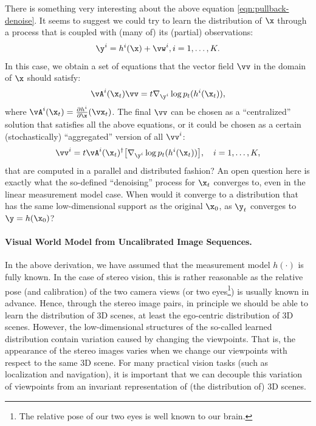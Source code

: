 \documentclass[../../book-main.tex]{subfiles}
\begin{document}
\begin{remark}
    {There is something very interesting about the above equation
        \eqref{eqn:pullback-denoise}. It seems to suggest we could
        try to learn the distribution of $\x$ through a process that
        is coupled with (many of) its (partial) observations:
        \begin{equation}
            \y^i = h^i(\x) +\vw^i, i =1, \ldots, K.
        \end{equation} In this case, we obtain a set of equations
        that the vector field $\vv$ in the domain of $\x$ should satisfy:
        \begin{equation}
            \vA^i(\x_t) \vv = t \nabla_{\y^i} \log p_t(h^i(\x_t)),
            \label{eqn:federated-pushforward}
        \end{equation}
        where $\vA^i(\x_t) = \frac{\partial h^i}{\partial
        \x}(\vx_t)$. The final $\vv$ can be chosen as a
        ``centralized'' solution that satisfies all the above
        equations, or it could be chosen as a certain
        (stochastically) ``aggregated'' version of all $\vv^i$:
        \begin{equation}
            \vv^i = t\vA^i(\x_t)^\dagger \big[\nabla_{\y^i} \log
            p_t(h^i(\x_t))\big], \quad i = 1, \ldots, K,
        \end{equation}
        that are computed in a parallel and distributed fashion? An open
        question here is exactly what the so-defined ``denoising''
        process for $\x_t$ converges to, even in the linear measurement
        model case. When would it converge to a distribution that has the
        same low-dimensional support as the original $\x_0$, as $\y_t$
    converges to $\y = h(\x_0)$? }
\end{remark}

\paragraph{Visual World Model from Uncalibrated Image Sequences.}

In the above derivation, we have assumed that the measurement model
$h(\cdot)$ is fully known. In the case of stereo vision, this is
rather reasonable as the relative pose (and calibration) of the two
camera views (or two eyes\footnote{The relative pose of our two eyes
is well known to our brain.}) is usually known in advance. Hence,
through the stereo image pairs, in principle we should be able to
learn the distribution of 3D scenes, at least the ego-centric
distribution of 3D scenes. However, the low-dimensional structures of
the so-called learned distribution contain variation caused by
changing the viewpoints. That is, the appearance of the stereo images
varies when we change our viewpoints with respect to the same 3D
scene. For many practical vision tasks (such as localization and
navigation), it is important that we can decouple this variation of
viewpoints from an invariant representation of (the distribution of) 3D scenes.
\end{document}
